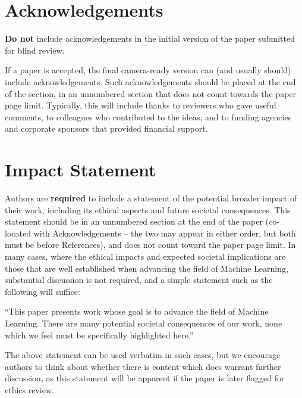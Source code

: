 \documentclass{article}
\theoremstyle{plain}
\theoremstyle{definition}
\theoremstyle{remark}
\begin{document}
\section*{Acknowledgements}

\textbf{Do not} include acknowledgements in the initial version of the paper
submitted for blind review.

If a paper is accepted, the final camera-ready version can (and usually should)
include acknowledgements.  Such acknowledgements should be placed at the end of
the section, in an unnumbered section that does not count towards the paper
page limit. Typically, this will include thanks to reviewers who gave useful
comments, to colleagues who contributed to the ideas, and to funding agencies
and corporate sponsors that provided financial support.

\section*{Impact Statement}

Authors are \textbf{required} to include a statement of the potential broader
impact of their work, including its ethical aspects and future societal
consequences. This statement should be in an unnumbered section at the end of
the paper (co-located with Acknowledgements -- the two may appear in either
order, but both must be before References), and does not count toward the paper
page limit. In many cases, where the ethical impacts and expected societal
implications are those that are well established when advancing the field of
Machine Learning, substantial discussion is not required, and a simple
statement such as the following will suffice:

``This paper presents work whose goal is to advance the field of Machine
Learning. There are many potential societal consequences of our work, none
which we feel must be specifically highlighted here.''

The above statement can be used verbatim in such cases, but we encourage
authors to think about whether there is content which does warrant further
discussion, as this statement will be apparent if the paper is later flagged
for ethics review.

\nocite{langley00}



\end{document}
